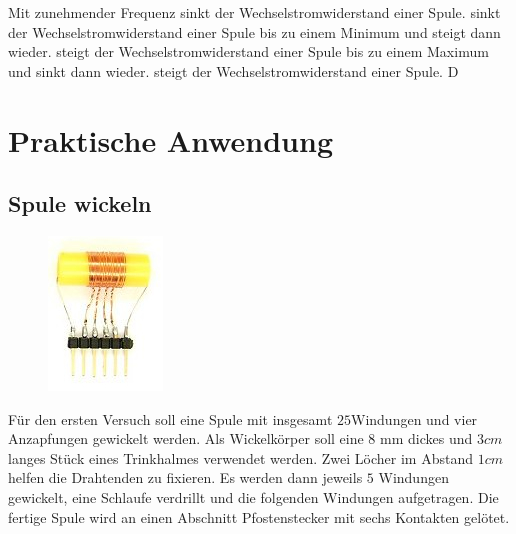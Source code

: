 {Mit zunehmender Frequenz}%
{sinkt der Wechselstromwiderstand einer Spule.}%
{sinkt der Wechselstromwiderstand einer Spule
bis zu einem Minimum und steigt dann wieder.}%
{steigt der Wechselstromwiderstand einer Spule
bis zu einem Maximum und sinkt dann wieder.}%
{steigt der Wechselstromwiderstand einer Spule.}%
{D}%

\newpage

\section*{Praktische Anwendung}

\subsection*{Spule wickeln}

\begin{figure}
 \vspace{-10pt}
 \centering 
 \includegraphics[scale=4]{Spule/Bilder/Spule_bau.jpg}
 \vspace{-5pt}
\end{figure}

Für den ersten Versuch soll eine Spule mit insgesamt $25 $Windungen und vier Anzapfungen gewickelt werden. Als Wickelkörper soll eine 8 mm dickes und $3cm$ langes Stück eines Trinkhalmes verwendet werden. Zwei Löcher im Abstand $1cm$ helfen die Drahtenden zu fixieren. Es werden dann jeweils $5$ Windungen gewickelt, eine Schlaufe verdrillt und die folgenden Windungen aufgetragen. Die fertige Spule wird an einen Abschnitt Pfostenstecker mit sechs Kontakten gelötet. 

